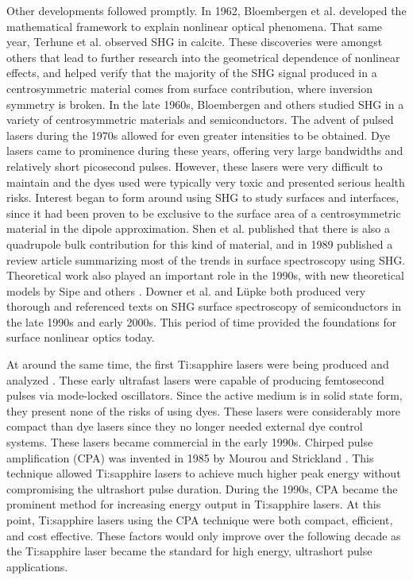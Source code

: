 Other developments followed promptly. In 1962, Bloembergen et al.
\cite{PhysRev.127.1918, PhysRev.128.606} developed the mathematical framework to
explain nonlinear optical phenomena. That same year, Terhune et al.
\cite{PhysRevLett.8.404} observed SHG in calcite. These discoveries were amongst
others \cite{lax1962nonlinear} that lead to further research into the
geometrical dependence of nonlinear effects, and helped verify that the majority
of the SHG signal produced in a centrosymmetric material comes from surface
contribution, where inversion symmetry is broken. In the late 1960s, Bloembergen
\cite{PhysRev.174.813} and others \cite{PhysRev.178.1218} studied SHG in a
variety of centrosymmetric materials and semiconductors. The advent of pulsed
lasers during the 1970s \cite{nla.cat-vn2583352} allowed for even greater
intensities to be obtained. Dye lasers came to prominence during these years,
offering very large bandwidths and relatively short picosecond pulses. However,
these lasers were very difficult to maintain and the dyes used were typically
very toxic and presented serious health risks. Interest began to form around
using SHG to study surfaces and interfaces, since it had been proven
\cite{PhysRevLett.46.145} to be exclusive to the surface area of a
centrosymmetric material in the dipole approximation. Shen et al. published
\cite{PhysRevB.38.7985} that there is also a quadrupole bulk contribution for
this kind of material, and in 1989 \cite{shen89nature} published a review
article summarizing most of the trends in surface spectroscopy using SHG.
Theoretical work also played an important role in the 1990s, with new
theoretical models by Sipe \cite{PhysRevB.53.10751} and others
\cite{PhysRevB.53.4999, PhysRevB.60.14334, PhysRevB.55.2489, PhysRevB.57.2569}.
Downer et al. \cite{downer2001optical} and L\"upke \cite{Lupke199975} both
produced very thorough and referenced texts on SHG surface spectroscopy of
semiconductors in the late 1990s and early 2000s. This period of time provided
the foundations for surface nonlinear optics today.

At around the same time, the first Ti:sapphire lasers were being produced and
analyzed \cite{Moulton:86}. These early ultrafast lasers were capable of
producing femtosecond pulses via mode-locked oscillators. Since the active
medium is in solid state form, they present none of the risks of using dyes.
These lasers were considerably more compact than dye lasers since they no longer
needed external dye control systems. These lasers became commercial in the early
1990s. Chirped pulse amplification (CPA) was invented in 1985 by Mourou and
Strickland \cite{Strickland1985447}. This technique allowed Ti:sapphire lasers
to achieve much higher peak energy without compromising the ultrashort pulse
duration. During the 1990s, CPA became the prominent method for increasing
energy output in Ti:sapphire lasers. At this point, Ti:sapphire lasers using the
CPA technique were both compact, efficient, and cost effective. These factors
would only improve over the following decade as the Ti:sapphire laser became the
standard for high energy, ultrashort pulse applications.


